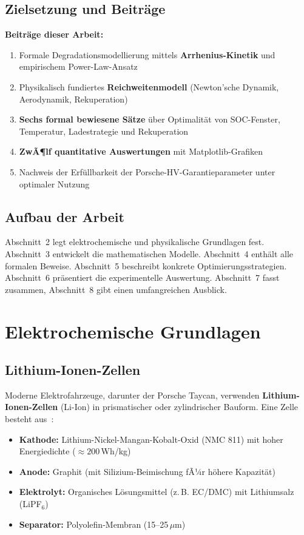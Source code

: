 ﻿\documentclass[a4paper,12pt]{article}
\theoremstyle{definition}
\begin{document}
\subsection{Zielsetzung und Beitr\"age}

\textbf{Beitr\"age dieser Arbeit:}
\begin{enumerate}
  \item Formale Degradationsmodellierung mittels \textbf{Arrhenius-Kinetik}
    und empirischem Power-Law-Ansatz
  \item Physikalisch fundiertes \textbf{Reichweitenmodell} (Newton'sche Dynamik,
    Aerodynamik, Rekuperation)
  \item \textbf{Sechs formal bewiesene S\"atze} \"uber Optimalit\"at von
    SOC-Fenster, Temperatur, Ladestrategie und Rekuperation
  \item \textbf{ZwÃ¶lf quantitative Auswertungen} mit Matplotlib-Grafiken
  \item Nachweis der Erf\"ullbarkeit der Porsche-HV-Garantieparameter
    unter optimaler Nutzung
\end{enumerate}

\subsection{Aufbau der Arbeit}

Abschnitt~2 legt elektrochemische und physikalische Grundlagen fest.
Abschnitt~3 entwickelt die mathematischen Modelle.
Abschnitt~4 enth\"alt alle formalen Beweise.
Abschnitt~5 beschreibt konkrete Optimierungsstrategien.
Abschnitt~6 pr\"asentiert die experimentelle Auswertung.
Abschnitt~7 fasst zusammen, Abschnitt~8 gibt einen umfangreichen Ausblick.

\section{Elektrochemische Grundlagen}

\subsection{Lithium-Ionen-Zellen}

Moderne Elektrofahrzeuge, darunter der Porsche Taycan, verwenden
\textbf{Lithium-Ionen-Zellen} (Li-Ion) in prismatischer oder zylindrischer
Bauform. Eine Zelle besteht aus~\cite{Vetter2005}:
\begin{itemize}
  \item \textbf{Kathode:} Lithium-Nickel-Mangan-Kobalt-Oxid (NMC 811)
    mit hoher Energiedichte ($\approx 200$\,Wh/kg)
  \item \textbf{Anode:} Graphit (mit Silizium-Beimischung fÃ¼r h\"ohere Kapazit\"at)
  \item \textbf{Elektrolyt:} Organisches L\"osungsmittel (z.\,B. EC/DMC)
    mit Lithiumsalz (LiPF$_6$)
  \item \textbf{Separator:} Polyolefin-Membran (15--25\,\(\mu\)m)
\end{itemize}
\end{document}
